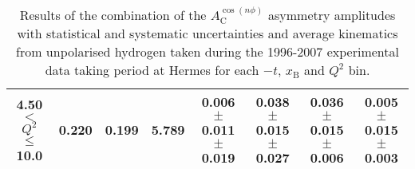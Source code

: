 \begin{table}[width=15cm]
\begin{center}
{\begin{tabular}{|c|c|c|c|c|c|c|c|}
4.50 $<$ $Q^{2}$ $\leqslant$ 10.0 & 0.220  & 0.199 & 5.789  &  0.006  $\pm$  0.011  $\pm$   0.019 & 
0.038  $\pm$  0.015  $\pm$  0.027 & 0.036 $\pm$   0.015  $\pm$  0.006 & 0.005   $\pm$  0.015   $\pm$   0.003\\
\hline
  \end{tabular}
}
 \end{center}
\caption{Results of the combination of the $A_{\textrm{C}}^{\cos(n\phi)}$ asymmetry amplitudes with statistical and systematic uncertainties and average kinematics from unpolarised hydrogen taken during
the 1996-2007 experimental data taking period at H{\sc ermes} for each $-t$, $x_{\textrm{B}}$ and $Q^{2}$ bin.}
\end{table}

